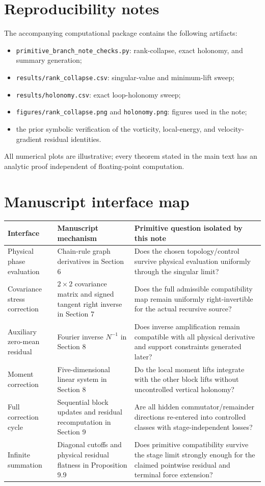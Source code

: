 \documentclass[12pt]{article}
\begin{document}
\section{Reproducibility notes}
The accompanying computational package contains the following artifacts:
\begin{itemize}
\item \texttt{primitive\_branch\_note\_checks.py}: rank-collapse, exact holonomy, and summary generation;
\item \texttt{results/rank\_collapse.csv}: singular-value and minimum-lift sweep;
\item \texttt{results/holonomy.csv}: exact loop-holonomy sweep;
\item \texttt{figures/rank\_collapse.png} and \texttt{holonomy.png}: figures used in the note;
\item the prior symbolic verification of the vorticity, local-energy, and velocity-gradient residual identities.
\end{itemize}
All numerical plots are illustrative; every theorem stated in the main text has an analytic proof independent of floating-point computation.

\section{Manuscript interface map}
\begin{longtable}{p{}p{}p{}}
\toprule
Interface & Manuscript mechanism & Primitive question isolated by this note \\
\midrule
\endhead
Physical phase evaluation & Chain-rule graph derivatives in Section 6 & Does the chosen topology/control survive physical evaluation uniformly through the singular limit? \\
Covariance stress correction & $2\times2$ covariance matrix and signed tangent right inverse in Section 7 & Does the full admissible compatibility map remain uniformly right-invertible for the actual recursive source? \\
Auxiliary zero-mean residual & Fourier inverse $N^{-1}$ in Section 8 & Does inverse amplification remain compatible with all physical derivative and support constraints generated later? \\
Moment correction & Five-dimensional linear system in Section 8 & Do the local moment lifts integrate with the other block lifts without uncontrolled vertical holonomy? \\
Full correction cycle & Sequential block updates and residual recomputation in Section 9 & Are all hidden commutator/remainder directions re-entered into controlled classes with stage-independent losses? \\
Infinite summation & Diagonal cutoffs and physical residual flatness in Proposition 9.9 & Does primitive compatibility survive the stage limit strongly enough for the claimed pointwise residual and terminal force extension? \\
\bottomrule
\end{longtable}
\end{document}
